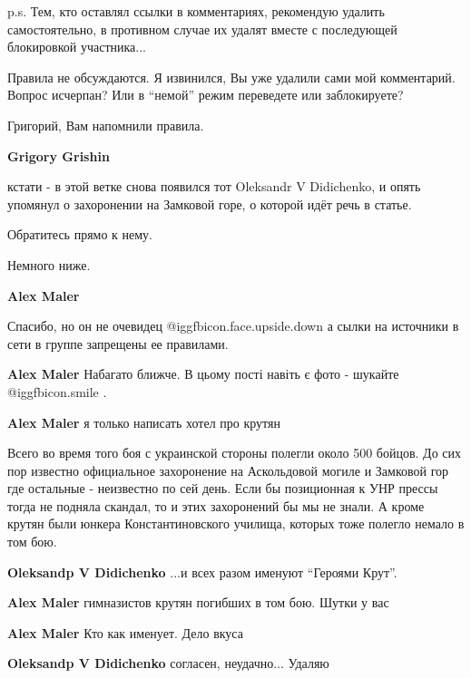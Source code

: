 \begin{itemize}
\begin{itemize}
\begin{itemize}
p.s. Тем, кто оставлял ссылки в комментариях, рекомендую удалить
самостоятельно, в противном случае их удалят вместе с последующей блокировкой
участника...


Правила не обсуждаются. Я извинился, Вы уже удалили сами мой комментарий.
Вопрос исчерпан? Или в \enquote{немой} режим переведете или заблокируете?

Григорий, Вам напомнили правила.

\textbf{Grigory Grishin} 

кстати - в этой ветке снова появился тот Oleksandr V Didichenko, и опять
упомянул о захоронении на Замковой горе, о которой идёт речь в статье.

Обратитесь прямо к нему.

Немного ниже.

\textbf{Alex Maler} 

Спасибо, но он не очевидец @igg{fbicon.face.upside.down}  а сылки на источники
в сети в группе запрещены ее правилами.

\end{itemize} %

\textbf{Alex Maler} Набагато ближче. В цьому пості навіть є фото - шукайте  @igg{fbicon.smile} .

\textbf{Alex Maler} я только написать хотел про крутян

\begin{itemize} %

Всего во время того боя с украинской стороны полегли около 500 бойцов. До сих
пор известно официальное захоронение на Аскольдовой могиле и Замковой гор где
остальные - неизвестно по сей день. Если бы позиционная к УНР прессы тогда не
подняла скандал, то и этих захоронений бы мы не знали. А кроме крутян были
юнкера Константиновского училища, которых тоже полегло немало в том бою.

\textbf{Oleksandp V Didichenko} ...и всех разом именуют \enquote{Героями Крут}.

\textbf{Alex Maler} гимназистов крутян погибших в том бою. Шутки у вас

\textbf{Alex Maler} Кто как именует. Дело вкуса

\textbf{Oleksandp V Didichenko} согласен, неудачно... Удаляю
\end{itemize} %



\end{itemize}
\end{itemize}
